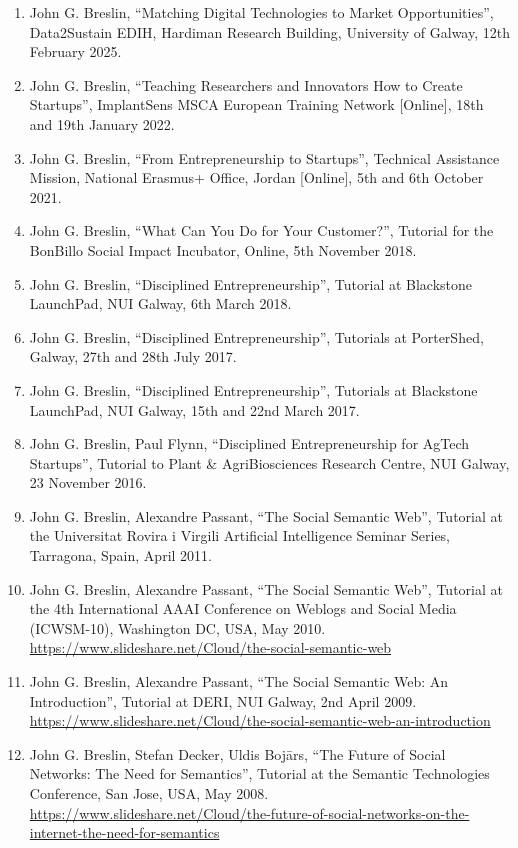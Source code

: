 \documentclass[10pt,a4paper]{res} %
\begin{document}
\begin{resume}
\begin{enumerate} \itemsep -2pt
\item John G. Breslin, ``Matching Digital Technologies to Market Opportunities'', Data2Sustain EDIH, Hardiman Research Building, University of Galway, 12th February 2025.
\item John G. Breslin, ``Teaching Researchers and Innovators How to Create Startups'', ImplantSens MSCA European Training Network [Online], 18th and 19th January 2022.
\item John G. Breslin, ``From Entrepreneurship to Startups'', Technical Assistance Mission, National Erasmus+ Office, Jordan [Online], 5th and 6th October 2021. %
\item John G. Breslin, ``What Can You Do for Your Customer?'', Tutorial for the BonBillo Social Impact Incubator, Online, 5th November 2018. %
\item John G. Breslin, ``Disciplined Entrepreneurship'', Tutorial at Blackstone LaunchPad, NUI Galway, 6th March 2018. %
\item John G. Breslin, ``Disciplined Entrepreneurship'', Tutorials at PorterShed, Galway, 27th and 28th July 2017. %
\item John G. Breslin, ``Disciplined Entrepreneurship'', Tutorials at Blackstone LaunchPad, NUI Galway, 15th and 22nd March 2017. %
\item John G. Breslin, Paul Flynn, ``Disciplined Entrepreneurship for AgTech Startups'', Tutorial to Plant \& AgriBiosciences Research Centre, NUI Galway, 23 November 2016. %
\item John G. Breslin, Alexandre Passant, ``The Social Semantic Web'', Tutorial at the Universitat Rovira i Virgili Artificial Intelligence Seminar Series, Tarragona, Spain, April 2011. %
\item John G. Breslin, Alexandre Passant, ``The Social Semantic Web'', Tutorial at the 4th International AAAI Conference on Weblogs and Social Media (ICWSM-10), Washington DC, USA, May 2010. \url{https://www.slideshare.net/Cloud/the-social-semantic-web}
\item John G. Breslin, Alexandre Passant, ``The Social Semantic Web: An Introduction'', Tutorial at DERI, NUI Galway, 2nd April 2009. \url{https://www.slideshare.net/Cloud/the-social-semantic-web-an-introduction}
\item John G. Breslin, Stefan Decker, Uldis Boj\={a}rs, ``The Future of Social Networks: The Need for Semantics'', Tutorial at the Semantic Technologies Conference, San Jose, USA, May 2008. \url{https://www.slideshare.net/Cloud/the-future-of-social-networks-on-the-internet-the-need-for-semantics}

\end{enumerate}
\end{resume}
\end{document}

